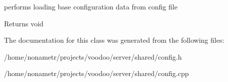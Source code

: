 performs loading base configuration data from config file 

\begin{DoxyReturn}{\-Returns}
void 
\end{DoxyReturn}


\-The documentation for this class was generated from the following files\-:\begin{DoxyCompactItemize}
\item 
/home/nonametr/projects/voodoo/server/shared/config.\-h\item 
/home/nonametr/projects/voodoo/server/shared/config.\-cpp\end{DoxyCompactItemize}
